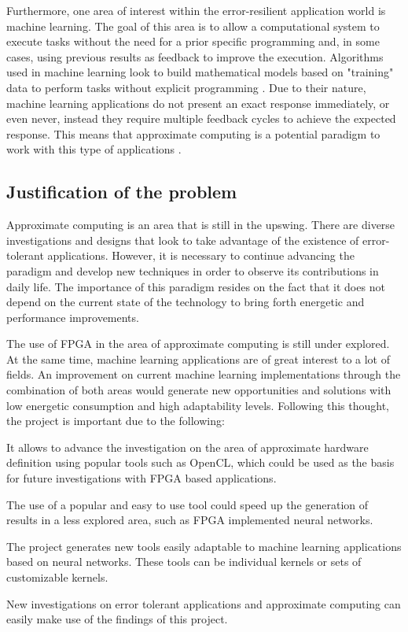 Furthermore, one area of interest within the error-resilient application world is machine learning.
The goal of this area is to allow a computational system to execute tasks without the need for a prior
specific programming and, in some cases, using previous results as feedback to improve the execution.
Algorithms used in machine learning look to build mathematical models based on "training" data to perform
tasks without explicit programming \cite{patternrecogbook}. Due to their nature, machine learning applications do not present
an exact response immediately, or even never, instead they require multiple feedback cycles to achieve
the expected response. This means that approximate computing is a potential paradigm to work with this
type of applications \cite{approximatecomp}.

\subsection{Justification of the problem}

Approximate computing is an area that is still in the upswing. There are diverse investigations and designs
that look to take advantage of the existence of error-tolerant applications. However, it is necessary to
continue advancing the paradigm and develop new techniques in order to observe its contributions in daily
life. The importance of this paradigm resides on the fact that it does not depend on the current state
of the technology to bring forth energetic and performance improvements.

The use of FPGA in the area of approximate computing is still under explored. At the same time, machine
learning applications are of great interest to a lot of fields. An improvement on current machine learning
implementations through the combination of both areas would generate new opportunities and solutions
with low energetic consumption and high adaptability levels. Following this thought, the project is
important due to the following:

\begin{compactitem}
    \item It allows to advance the investigation on the area of approximate hardware definition
    using popular tools such as OpenCL, which could be used as the basis for future investigations
    with FPGA based applications.
    \item The use of a popular and easy to use tool could speed up the generation of results in a
    less explored area, such as FPGA implemented neural networks.
    \item The project generates new tools easily adaptable to machine learning applications based
    on neural networks. These tools can be individual kernels or sets of customizable kernels. 
    \item New investigations on error tolerant applications and approximate computing can easily 
    make use of the findings of this project.
\end{compactitem}



